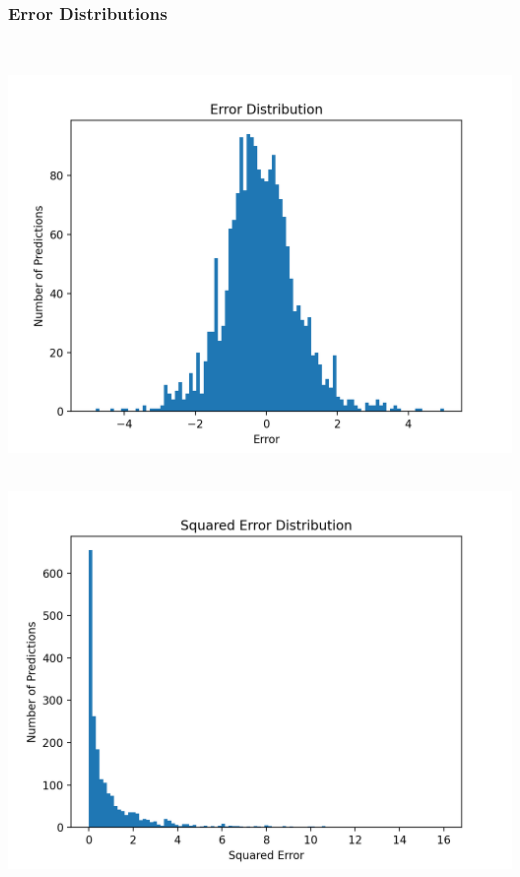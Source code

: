 \documentclass[11pt]{article}
\newcommand{\np}{\newpage}
\begin{document}
\subsubsection{Error Distributions}
\mbox{}\\
\begin{minipage}{0.45\textwidth}
\includegraphics[scale=0.5]{bert/error.png}
\end{minipage}
\hfill
\begin{minipage}{0.45\textwidth}
\mbox{}\\
\includegraphics[scale=0.5]{bert/squared_error.png}
\end{minipage}
\np
\end{document}
